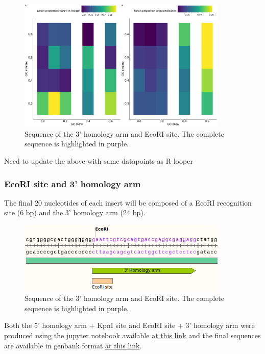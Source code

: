 \documentclass[11pt]{article}
\begin{document}
\begin{figure}[H]
	\includegraphics[width=10cm]{images/plots/rna_secondary_structure_temp.png}
	\centering
	\caption{Sequence of the 3' homology arm and EcoRI site. The complete sequence is highlighted in purple.}
	\label{fig:3_prime_arm}
\end{figure}

Need to update the above with same datapoints as R-looper

\subsubsection{EcoRI site and 3' homology arm}

The final 20 nucleotides of each insert will be composed of a EcoRI recognition site (6 bp) and the 3' homology arm (24 bp). 

\begin{figure}[H]
	\includegraphics[width=10cm]{images/variable_region/3_homology_arm.png}
	\centering
	\caption{Sequence of the 3' homology arm and EcoRI site. The complete sequence is highlighted in purple.}
	\label{fig:3_prime_arm}
\end{figure}

Both the 5' homology arm + KpnI site and EcoRI site + 3' homology arm were produced using the jupyter notebook available \href{https://github.com/EthanHolleman/plasmid-VR-design/blob/main/notes/homology_arms.ipynb}{at this link} and the final sequences are available in genbank format \href{https://github.com/EthanHolleman/plasmid-VR-design/tree/main/resources/files/genbank}{at this link}.
\end{document}
